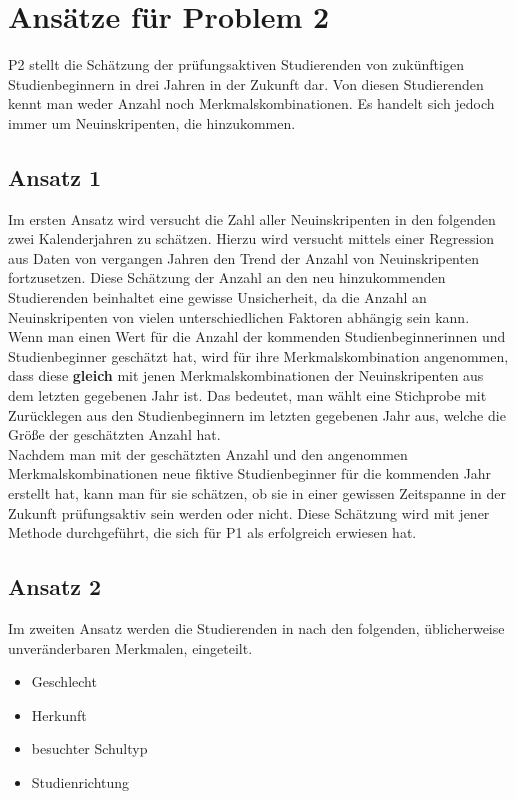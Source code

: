 


\section{Ans\"atze f\"ur Problem 2}
P2 stellt die Sch\"atzung der pr\"ufungsaktiven Studierenden von zuk\"unftigen Studienbeginnern in drei Jahren in der Zukunft dar. Von diesen Studierenden
kennt man weder Anzahl noch Merkmalskombinationen. Es handelt sich jedoch immer um Neuinskripenten, die hinzukommen.

\subsection{Ansatz 1}
Im ersten Ansatz wird versucht die Zahl aller Neuinskripenten in den folgenden zwei Kalenderjahren zu sch\"atzen. Hierzu wird versucht mittels einer Regression aus 
Daten von vergangen Jahren den Trend der Anzahl von Neuinskripenten fortzusetzen. Diese Sch\"atzung der Anzahl an den neu hinzukommenden Studierenden beinhaltet 
eine gewisse Unsicherheit, da die Anzahl an Neuinskripenten von vielen unterschiedlichen Faktoren abh\"angig sein kann. \\

\noindent Wenn man einen Wert f\"ur die Anzahl der kommenden Studienbeginnerinnen und Studienbeginner gesch\"atzt hat, wird f\"ur ihre Merkmalskombination angenommen, 
dass diese \textbf{gleich} mit jenen Merkmalskombinationen der Neuinskripenten aus dem letzten gegebenen Jahr ist. Das bedeutet, man w\"ahlt eine Stichprobe mit Zur\"ucklegen aus den Studienbeginnern im letzten gegebenen 
Jahr aus, welche die Gr\"o{\ss}e der gesch\"atzten Anzahl hat. \\

\noindent Nachdem man mit der gesch\"atzten Anzahl und den angenommen Merkmalskombinationen neue fiktive Studienbeginner f\"ur die kommenden Jahr erstellt hat, kann man 
f\"ur sie sch\"atzen, ob sie in einer gewissen Zeitspanne in der Zukunft pr\"ufungsaktiv sein werden oder nicht. Diese Sch\"atzung wird mit jener Methode durchgef\"uhrt, die 
sich f\"ur P1 als erfolgreich erwiesen hat. 


\subsection{Ansatz 2}
Im zweiten Ansatz werden die Studierenden in nach den folgenden, \"ublicherweise unver\"anderbaren Merkmalen, eingeteilt.

\begin{itemize}
  \item Geschlecht
  \item Herkunft
  \item besuchter Schultyp
  \item Studienrichtung
\end{itemize}

